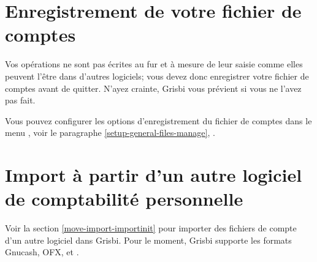 \section{Enregistrement de votre fichier de comptes\label{start-save}}


Vos opérations ne sont pas écrites au fur et à mesure de leur saisie comme elles peuvent l'être dans d'autres logiciels; vous devez donc enregistrer votre fichier de comptes avant de quitter. N'ayez crainte, Grisbi vous prévient si vous ne l'avez pas fait. 

Vous pouvez configurer les options d'enregistrement du fichier de comptes dans le menu , voir le paragraphe \vref{setup-general-files-manage}, .


\section{Import à partir d'un autre logiciel de comptabilité personnelle}

Voir la section \vref{move-import-importinit} pour importer des fichiers de compte d'un autre logiciel dans Grisbi. Pour le moment, Grisbi supporte les formats \gls{Gnucash}, \gls{OFX},  et .


